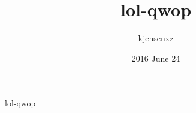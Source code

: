 \documentclass{article}
\title{lol-qwop}
\author{kjensenxz}
\date{2016 June 24}
\begin{document}
\maketitle
lol-qwop
\end{document}
